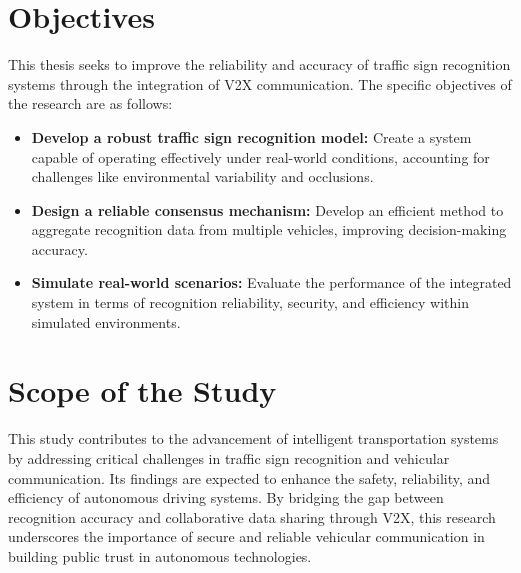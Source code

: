 \section{Objectives}

This thesis seeks to improve the reliability and accuracy of traffic sign recognition systems through the integration of V2X communication. The specific objectives of the research are as follows:

\begin{itemize}
    \item \textbf{Develop a robust traffic sign recognition model:} Create a system capable of operating effectively under real-world conditions, accounting for challenges like environmental variability and occlusions.
    \item \textbf{Design a reliable consensus mechanism:} Develop an efficient method to aggregate recognition data from multiple vehicles, improving decision-making accuracy.
    \item \textbf{Simulate real-world scenarios:} Evaluate the performance of the integrated system in terms of recognition reliability, security, and efficiency within simulated environments.
\end{itemize}

\section{Scope of the Study}

This study contributes to the advancement of intelligent transportation systems by addressing critical challenges in traffic sign recognition and vehicular communication. Its findings are expected to enhance the safety, reliability, and efficiency of autonomous driving systems. By bridging the gap between recognition accuracy and collaborative data sharing through V2X, this research underscores the importance of secure and reliable vehicular communication in building public trust in autonomous technologies.


